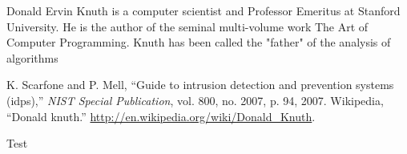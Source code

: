 \documentclass{fisatprojectfinal}
\begin{document}
Donald Ervin Knuth \cite{knuth} is a computer scientist and Professor Emeritus at Stanford University. He is the author of the seminal multi-volume work The Art of Computer Programming. Knuth has been called the "father" of the analysis of algorithms


\begin{thebibliography}{1}
 K. Scarfone and P. Mell, ``Guide to intrusion detection and prevention systems
(idps),'' \textit{NIST Special Publication}, vol. 800, no. 2007, p. 94, 2007.
 Wikipedia, ``Donald knuth.'' \url{http://en.wikipedia.org/wiki/Donald_Knuth}.
\end{thebibliography}

\begin{appendices}
Test
\end{appendices}
\end{document}
